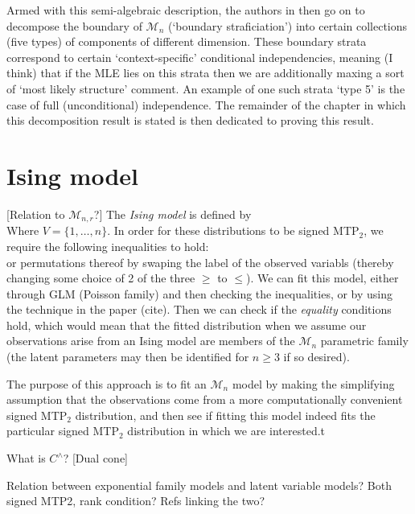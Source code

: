 \documentclass{article}
\theoremstyle{plain}
\theoremstyle{definition}
\theoremstyle{plain} %
\newcommand{\M}{{\mathcal M}}
\begin{document}
\vspace{2ex}
Armed with this semi-algebraic description, the authors in \cite{allman2017maximum} then go on to decompose the boundary of $\mathcal{M}_n$ (`boundary straficiation') into certain collections (five types) of components of different dimension. These boundary strata correspond to certain `context-specific' conditional independencies, meaning (I think) that if the MLE lies on this strata then we are additionally maxing a sort of `most likely structure' comment. An example of one such strata `type 5' is the case of full (unconditional) independence. The remainder of the chapter in which this decomposition result is stated is then dedicated to proving this result.

\section{Ising model}
[Relation to $\M_{n,r}$?]
The \textit{Ising model} is defined by
$$$$
Where $V=\{1,\dots,n\}$. In order for these distributions to be signed MTP$_2$, we require the following inequalities to hold:
$$$$
or permutations thereof by swaping the label of the observed variabls (thereby changing some choice of 2 of the three $\geq$ to $\leq$). We can fit this model, either through GLM (Poisson family) and then checking the inequalities, or by using the technique in the paper (cite). Then we can check if the \textit{equality} conditions hold, which would mean that the fitted distribution when we assume our observations arise from an Ising model are members of the $\mathcal{M}_n$ parametric family (the latent parameters may then be identified for $n\geq 3$ if so desired).

\vspace{1ex}
The purpose of this approach is to fit an $\mathcal{M}_n$ model by making the simplifying assumption that the observations come from a more computationally convenient signed MTP$_2$ distribution, and then see if fitting this model indeed fits the particular signed MTP$_2$ distribution in which we are interested.t

\vspace{1ex}
What is $C^\wedge$? [Dual cone]

\vspace{1ex}
Relation between exponential family models and latent variable models? Both signed MTP2, rank condition? Refs linking the two?

\pagebreak


\end{document}
